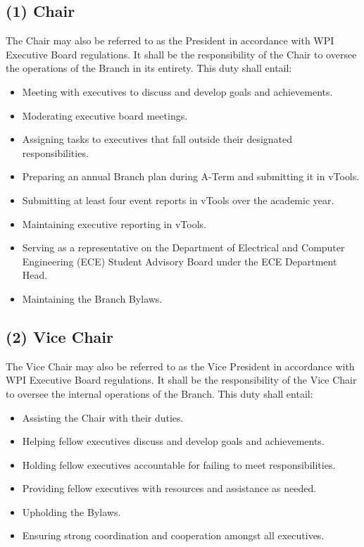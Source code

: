 \documentclass[11pt]{article}
\begin{document}
\subsection*{(1) Chair}

The Chair may also be referred to as the President in accordance with WPI Executive Board regulations. It shall be the responsibility of the Chair to oversee the operations of the Branch in its entirety. This duty shall entail:

\begin{itemize}
    \item Meeting with executives to discuss and develop goals and achievements.
    \item Moderating executive board meetings.
    \item Assigning tasks to executives that fall outside their designated responsibilities.
    \item Preparing an annual Branch plan during A-Term and submitting it in vTools.
    \item Submitting at least four event reports in vTools over the academic year.
    \item Maintaining executive reporting in vTools.
    \item Serving as a representative on the Department of Electrical and Computer Engineering (ECE) Student Advisory Board under the ECE Department Head.
    \item Maintaining the Branch Bylaws.
\end{itemize}

\subsection*{(2) Vice Chair}

The Vice Chair may also be referred to as the Vice President in accordance with WPI Executive Board regulations. It shall be the responsibility of the Vice Chair to oversee the internal operations of the Branch. This duty shall entail:

\begin{itemize}
    \item Assisting the Chair with their duties.
    \item Helping fellow executives discuss and develop goals and achievements.
    \item Holding fellow executives accountable for failing to meet responsibilities.
    \item Providing fellow executives with resources and assistance as needed.
    \item Upholding the Bylaws.
    \item Ensuring strong coordination and cooperation amongst all executives.
\end{itemize}
\end{document}
